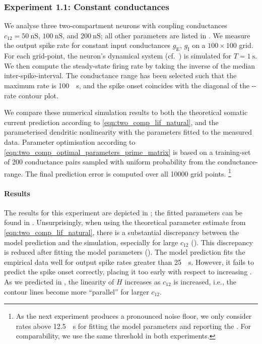 \subsubsection{Experiment 1.1: Constant conductances}
We analyse three two-compartment \LIF neurons with coupling conductances $c_{12} = \SI{50}{\nano\siemens}$, $\SI{100}{\nano\siemens}$, and $\SI{200}{\nano\siemens}$; all other parameters are listed in .
We measure the output spike rate for constant input conductances $g_\mathrm{E}$, $g_\mathrm{I}$ on a $100 \times 100$ grid.
For each grid-point, the neuron's dynamical system (cf.~) is simulated for $T = \SI{1}{\second}$.
We then compute the steady-state firing rate by taking the inverse of the median inter-spike-interval.
The conductance range has been selected such that the maximum rate is \SI{100}{\per\second}, and the spike onset coincides with the diagonal of the \gE-\gI-rate contour plot.

We compare these numerical simulation results to both the theoretical somatic current prediction according to \cref{eqn:two_comp_lif_natural}, and the parameterised dendritic nonlinearity with the parameters fitted to the measured data.
Parameter optimisation according to \cref{eqn:two_comp_optimal_parameters_prime_matrix} is based on a training-set of \num{200} conductance pairs sampled with uniform probability from the conductance-range.
The final prediction error is computed over all \num{10000} grid points.%
\footnote{As the next experiment produces a pronounced noise floor, we only consider rates above \SI{12.5}{\per\second} for fitting the model parameters and reporting the \RMSE. For comparability, we use the same threshold in both experiments.}

\paragraph{Results}
The results for this experiment are depicted in ; the fitted parameters can be found in .
Unsurprisingly, when using the theoretical parameter estimate from \cref{eqn:two_comp_lif_natural}, there is a substantial discrepancy between the model prediction and the simulation, especially for large $c_{12}$ (). This discrepancy is reduced after fitting the model parameters ().
The model prediction fits the empirical data well for output spike rates greater than \SI{25}{\per\second}.
However, it fails to predict the spike onset correctly, placing it too early with respect to increasing \gE.
As we predicted in , the linearity of $H$ increases as $c_{12}$ is increased, i.e., the contour lines become more \enquote{parallel} for larger $c_{12}$.

